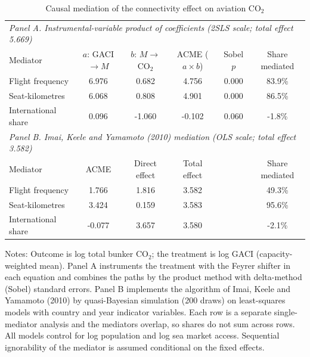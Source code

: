 \documentclass[12pt]{article}
\begin{document}
\begin{table}[htbp]
\centering
\begin{threeparttable}
\caption{Causal mediation of the connectivity effect on aviation CO$_2$}
\label{tab:mediation}
\footnotesize
\begin{tabular}{lccccc}
\toprule
\multicolumn{6}{l}{\textit{Panel A. Instrumental-variable product of coefficients (2SLS scale; total effect 5.669)}} \\
Mediator & $a$: GACI$\rightarrow M$ & $b$: $M\rightarrow$CO$_2$ & ACME ($a\times b$) & Sobel $p$ & Share mediated \\
\midrule
  Flight frequency & 6.976 & 0.682 & 4.756 & 0.000 & 83.9\% \\
  Seat-kilometres & 6.068 & 0.808 & 4.901 & 0.000 & 86.5\% \\
  International share & 0.096 & -1.060 & -0.102 & 0.060 & -1.8\% \\
\midrule
\multicolumn{6}{l}{\textit{Panel B. Imai, Keele and Yamamoto (2010) mediation (OLS scale; total effect 3.582)}} \\
Mediator & ACME & Direct effect & Total effect & & Share mediated \\
\midrule
  Flight frequency & 1.766 & 1.816 & 3.582 & & 49.3\% \\
  Seat-kilometres & 3.424 & 0.159 & 3.583 & & 95.6\% \\
  International share & -0.077 & 3.657 & 3.580 & & -2.1\% \\
\bottomrule
\end{tabular}
\begin{tablenotes}[flushleft]
\footnotesize
\item Notes: Outcome is log total bunker CO$_2$; the treatment is log GACI (capacity-weighted mean). Panel A instruments the treatment with the Feyrer shifter in each equation and combines the paths by the product method with delta-method (Sobel) standard errors. Panel B implements the algorithm of Imai, Keele and Yamamoto (2010) by quasi-Bayesian simulation (200 draws) on least-squares models with country and year indicator variables. Each row is a separate single-mediator analysis and the mediators overlap, so shares do not sum across rows. All models control for log population and log sea market access. Sequential ignorability of the mediator is assumed conditional on the fixed effects.
\end{tablenotes}
\end{threeparttable}
\end{table}
\end{document}
